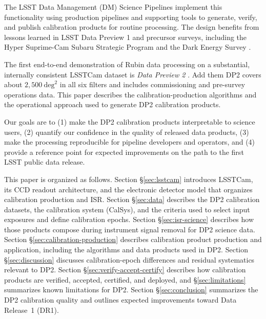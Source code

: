 The LSST Data Management (DM) Science Pipelines \citep{PSTN-019} implement this functionality using production pipelines and supporting tools to generate, verify, and publish calibration products for routine processing.
The design benefits from lessons learned in LSST Data Preview 1 \citep[DP1;][]{2026AJ....171..360V} and precursor surveys, including the Hyper Suprime-Cam Subaru Strategic Program \citep{2012SPIE.8446E..0ZM,2022PASJ...74..247A,2018PASJ...70S...5B} and the Dark Energy Survey \citep{2005astro.ph.10346T,2012PhPro..37.1332T,2018PASP..130g4501M}.

The first end-to-end demonstration of Rubin data processing on a substantial, internally consistent LSSTCam dataset is \emph{Data Preview 2} \citep[DP2;[]{RTN-117}.
Add them DP2 covers about $2{,}500~\mathrm{deg}^{2}$ in all six filters and includes commissioning and pre-survey operations data.
This paper describes the calibration-production algorithms and the operational approach used to generate DP2 calibration products.

Our goals are to (1) make the DP2 calibration products interpretable to science users, (2) quantify our confidence in the quality of released data products, (3) make the processing reproducible for pipeline developers and operators, and (4) provide a reference point for expected improvements on the path to the first LSST public data release.

This paper is organized as follows.
Section \S\ref{sec:lsstcam} introduces LSSTCam, its CCD readout architecture, and the electronic detector model that organizes calibration production and ISR.
Section \S\ref{sec:data} describes the DP2 calibration datasets, the calibration system (CalSys), and the criteria used to select input exposures and define calibration epochs.
Section \S\ref{sec:isr-science} describes how those products compose during instrument signal removal for DP2 science data.
Section \S\ref{sec:calibration-production} describes calibration product production and application, including the algorithms and data products used in DP2.
Section \S\ref{sec:discussion} discusses calibration-epoch differences and residual systematics relevant to DP2.
Section \S\ref{sec:verify-accept-certify} describes how calibration products are verified, accepted, certified, and deployed, and \S\ref{sec:limitations} summarizes known limitations for DP2.
Section \S\ref{sec:conclusion} summarizes the DP2 calibration quality and outlines expected improvements toward Data Release~1 (DR1).
